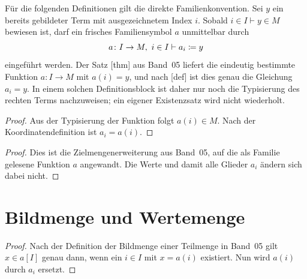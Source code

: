 \documentclass[main.tex]{subfiles}
\begin{document}
Für die folgenden Definitionen gilt die direkte Familienkonvention. Sei
\(y\) ein bereits gebildeter Term mit ausgezeichnetem Index \(i\). Sobald
\(i\in I\vdash y\in M\) bewiesen ist, darf ein frisches Familiensymbol \(a\)
unmittelbar durch
\[
  a\colon I\to M,\allowbreak\  i\in I\vdash a_i\coloneqq y
\]
eingeführt werden. Der Satz
[thm] aus Band~05 liefert die
eindeutig bestimmte Funktion \(a\colon I\to M\) mit \(a(i)=y\), und nach
[def] ist dies genau die Gleichung \(a_i=y\).
In einem solchen Definitionsblock ist daher nur noch die Typisierung des
rechten Terms nachzuweisen; ein eigener Existenzsatz wird nicht wiederholt.

\begin{proof}
Aus der Typisierung der Funktion folgt \(a(i)\in M\). Nach der
Koordinatendefinition ist \(a_i=a(i)\).
\end{proof}

\begin{proof}
Dies ist die Zielmengenerweiterung aus Band~05, auf die als Familie gelesene
Funktion \(a\) angewandt. Die Werte und damit alle Glieder \(a_i\) ändern
sich dabei nicht.
\end{proof}

\section{Bildmenge und Wertemenge}


\begin{proof}
Nach der Definition der Bildmenge einer Teilmenge in Band~05 gilt
\(x\in a[I]\) genau dann, wenn ein \(i\in I\) mit \(x=a(i)\) existiert.
Nun wird \(a(i)\) durch \(a_i\) ersetzt.
\end{proof}
\end{document}
